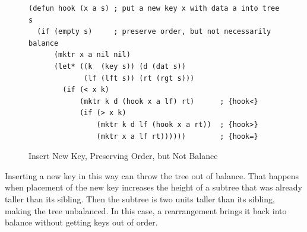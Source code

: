 \begin{figure}
\begin{center}
\begin{code}
\begin{verbatim}
(defun hook (x a s) ; put a new key x with data a into tree s
  (if (empty s)     ; preserve order, but not necessarily balance
      (mktr x a nil nil)
      (let* ((k  (key s)) (d (dat s))
             (lf (lft s)) (rt (rgt s)))
        (if (< x k)
            (mktr k d (hook x a lf) rt)      ; {hook<}
            (if (> x k)
                (mktr k d lf (hook x a rt))  ; {hook>}
                (mktr x a lf rt))))))        ; {hook=}
\end{verbatim}
\end{code}
\end{center}
\caption{Insert New Key, Preserving Order, but Not Balance}
\label{fig:hook-defun}
\end{figure}

Inserting a new key in this way
can throw the tree out of balance.
That happens when
placement of the new key increases the height of a subtree that was
already taller than its sibling.
Then the subtree is two units taller than its sibling,
making the tree unbalanced.
In this case, a rearrangement brings it back into balance
without getting keys out of order.

